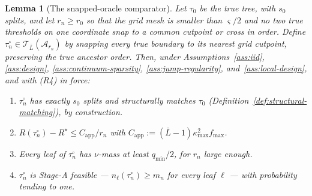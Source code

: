 \documentclass[11pt]{article}
\theoremstyle{plain}
\newtheorem{lemma}[theorem]{Lemma}
\theoremstyle{definition}
\theoremstyle{remark}
\newcommand{\cA}{\mathcal{A}}
\newcommand{\cT}{\mathcal{T}}
\begin{document}
\begin{lemma}[The snapped-oracle comparator]\label{lem:snapped-oracle}
Let \(\tau_0\) be the true tree, with \(s_0\) splits, and let \(r_n\ge r_0\)
so that the grid mesh is smaller than \(\varsigma/2\) and no two true
thresholds on one coordinate snap to a common cutpoint or cross in order.
Define \(\tau_n^\circ\in\cT_{\bar L}(\cA_{r_n})\) by snapping every true
boundary to its nearest grid cutpoint, preserving the true ancestor order.
Then, under Assumptions~\ref{ass:iid}, \ref{ass:design},
\ref{ass:continuum-sparsity}, \ref{ass:jump-regularity},
and~\ref{ass:local-design}, and with (R4) in force:
\begin{enumerate}[label=(\alph*),nosep]
  \item \(\tau_n^\circ\) has exactly \(s_0\) splits and structurally matches
  \(\tau_0\) (Definition~\ref{def:structural-matching}), by construction.
  \item \(R(\tau_n^\circ)-R^\star\le C_{\mathrm{app}}/r_n\) with
  \(C_{\mathrm{app}}:=(\bar L-1)\kappa_{\max}^2f_{\max}\).
  \item Every leaf of \(\tau_n^\circ\) has \(\nu\)-mass at least
  \(q_{\min}/2\), for \(r_n\) large enough.
  \item \(\tau_n^\circ\) is Stage-A feasible --- \(n_\ell(\tau_n^\circ)\ge
  m_n\) for every leaf \(\ell\) --- with probability tending to one.
\end{enumerate}
\end{lemma}
\end{document}
